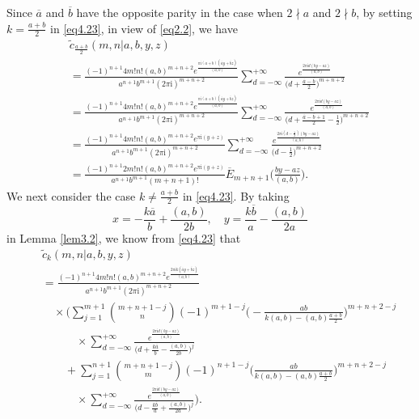 \documentclass[reqno]{amsart}
\numberwithin{equation}{section}
\begin{document}
Since $\overline{a}$ and $\overline{b}$ have the opposite parity in the case when $2\nmid a$ and $2\nmid b$, by setting $k=\frac{a+b}{2}$ in \eqref{eq4.23}, in view of \eqref{eq2.2}, we have
\begin{eqnarray}\label{eq4.24}
&&\widetilde{c}_{\frac{a+b}{2}}(m,n|a,b,y,z)\nonumber\\
&&=\frac{(-1)^{n+1}4m!n!(a,b)^{m+n+2}e^{\frac{\pi\mathrm{i}(a+b)(\overline{a}y+\overline{b}z)}{(a,b)}}}{a^{n+1}b^{m+1}(2\pi\mathrm{i})^{m+n+2}}\sum_{d=-\infty}^{+\infty}
\frac{e^{\frac{2\pi\mathrm{i}d(by-az)}{(a,b)}}}{\bigl(d+\frac{\overline{a}-\overline{b}}{2}\bigl)^{m+n+2}}\nonumber\\
&&=\frac{(-1)^{n+1}4m!n!(a,b)^{m+n+2}e^{\frac{\pi\mathrm{i}(a+b)(\overline{a}y+\overline{b}z)}{(a,b)}}}{a^{n+1}b^{m+1}(2\pi\mathrm{i})^{m+n+2}}\sum_{d=-\infty}^{+\infty}
\frac{e^{\frac{2\pi\mathrm{i}d(by-az)}{(a,b)}}}{\bigl(d+\frac{\overline{a}-\overline{b}+1}{2}-\frac{1}{2}\bigl)^{m+n+2}}\nonumber\\
&&=\frac{(-1)^{n+1}4m!n!(a,b)^{m+n+2}e^{\pi\mathrm{i}(y+z)}}{a^{n+1}b^{m+1}(2\pi\mathrm{i})^{m+n+2}}\sum_{d=-\infty}^{+\infty}
\frac{e^{\frac{2\pi\mathrm{i}(d-\frac{1}{2})(by-az)}{(a,b)}}}{\bigl(d-\frac{1}{2}\bigl)^{m+n+2}}\nonumber\\
&&=\frac{(-1)^{n+1}2m!n!(a,b)^{m+n+2}e^{\pi\mathrm{i}(y+z)}}{a^{n+1}b^{m+1}(m+n+1)!}\overline{E}_{m+n+1}\biggl(\frac{by-az}{(a,b)}\biggl).
\end{eqnarray}
We next consider the case $k\not=\frac{a+b}{2}$ in \eqref{eq4.23}. By taking
\begin{equation*}
x=-\frac{k\overline{a}}{b}+\frac{(a,b)}{2b}, \quad y=\frac{k\overline{b}}{a}-\frac{(a,b)}{2a}
\end{equation*}
in Lemma \ref{lem3.2}, we know from \eqref{eq4.23} that
\begin{eqnarray}\label{eq4.25}
&&\widetilde{c}_{k}(m,n|a,b,y,z)\nonumber\\
&&=\frac{(-1)^{n+1}4m!n!(a,b)^{m+n+2}e^{\frac{2\pi\mathrm{i}k(\overline{a}y+\overline{b}z)}{(a,b)}}}{a^{n+1}b^{m+1}(2\pi \mathrm{i})^{m+n+2}}\nonumber\\
&&\quad\times\biggl(\sum_{j=1}^{m+1}\binom{m+n+1-j}{n}(-1)^{m+1-j}\biggl(-\frac{ab}{k(a,b)-(a,b)\frac{a+b}{2}}\biggl)^{m+n+2-j}\nonumber\\
&&\qquad\quad\times\sum_{d=-\infty}^{+\infty}
\frac{e^{\frac{2\pi\mathrm{i}d(by-az)}{(a,b)}}}{\bigl(d+\frac{k\overline{a}}{b}-\frac{(a,b)}{2b}\bigl)^{j}}\nonumber\\
&&\qquad+\sum_{j=1}^{n+1}\binom{m+n+1-j}{m}(-1)^{n+1-j}\biggl(\frac{ab}{k(a,b)-(a,b)\frac{a+b}{2}}\biggl)^{m+n+2-j}\nonumber\\
&&\qquad\quad\times\sum_{d=-\infty}^{+\infty}\frac{e^{\frac{2\pi\mathrm{i}d(by-az)}{(a,b)}}}{\bigl(d-\frac{k\overline{b}}{a}+\frac{(a,b)}{2a}\bigl)^{j}}\biggl).
\end{eqnarray}
\end{document}

